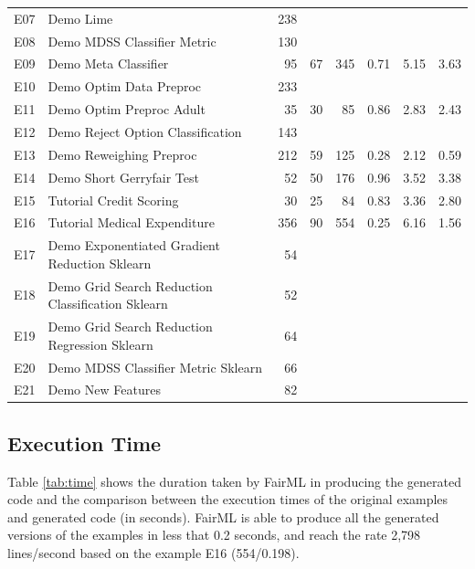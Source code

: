 \documentclass[sigconf,review]{acmart}
\begin{document}
\begin{table}[]
\begin{tabular}{clrrrrrr}
		E07 & Demo   Lime                                       & 238 &    &     &      &      &      \\
		E08 & Demo MDSS Classifier Metric                       & 130 &    &     &      &      &      \\
		E09 & Demo Meta Classifier                              & 95  & 67 & 345 & 0.71 & 5.15 & 3.63 \\
		E10 & Demo Optim Data Preproc                           & 233 &    &     &      &      &      \\
		E11 & Demo Optim Preproc Adult                          & 35  & 30 & 85  & 0.86 & 2.83 & 2.43 \\
		E12 & Demo Reject Option Classification                 & 143 &    &     &      &      &      \\
		E13 & Demo Reweighing Preproc                           & 212 & 59 & 125 & 0.28 & 2.12 & 0.59 \\
		E14 & Demo Short Gerryfair Test                         & 52  & 50 & 176 & 0.96 & 3.52 & 3.38 \\
		E15 & Tutorial Credit Scoring                           & 30  & 25 & 84  & 0.83 & 3.36 & 2.80 \\
		E16 & Tutorial Medical Expenditure                      & 356 & 90 & 554 & 0.25 & 6.16 & 1.56 \\
		E17 & Demo Exponentiated Gradient Reduction Sklearn     & 54  &    &     &      &      &      \\
		E18 & Demo Grid Search Reduction Classification Sklearn & 52  &    &     &      &      &      \\
		E19 & Demo Grid Search Reduction Regression Sklearn     & 64  &    &     &      &      &      \\
		E20 & Demo MDSS Classifier Metric Sklearn               & 66  &    &     &      &      &      \\
		E21 & Demo New Features                                 & 82  &    &     &      &      &      \\ \hline
	\end{tabular}
\end{table}


\subsection{Execution Time}
\label{sec:execution_time}

Table \ref{tab:time} shows the duration taken by FairML in producing the generated code and the comparison between the execution times of the original examples and generated code (in seconds). FairML is able to produce all the generated versions of the examples in less that 0.2 seconds, and reach the rate 2,798 lines/second based on the example E16 (554/0.198).
\end{document}
